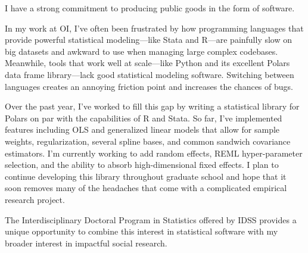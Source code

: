 \documentclass[header=false]{grad-statement}
\begin{document}
I have a strong commitment to producing public goods in the form of software.

In my work at OI, I've often been frustrated by how programming languages that provide powerful statistical modeling---like Stata and R---are painfully slow on big datasets and awkward to use when managing large complex codebases.
Meanwhile, tools that work well at scale---like Python and its excellent Polars data frame library---lack good statistical modeling software.
Switching between languages creates an annoying friction point and increases the chances of bugs.

Over the past year, I've worked to fill this gap by writing a statistical library for Polars on par with the capabilities of R and Stata.
So far, I've implemented features including OLS and generalized linear models that allow for sample weights, regularization, several spline bases, and common sandwich covariance estimators.
I'm currently working to add random effects, REML hyper-parameter selection, and the ability to absorb high-dimensional fixed effects.
I plan to continue developing this library throughout graduate school and hope that it soon removes many of the headaches that come with a complicated empirical research project.

The Interdisciplinary Doctoral Program in Statistics offered by IDSS provides a unique opportunity to combine this interest in statistical software with my broader interest in impactful social research.
\end{document}
